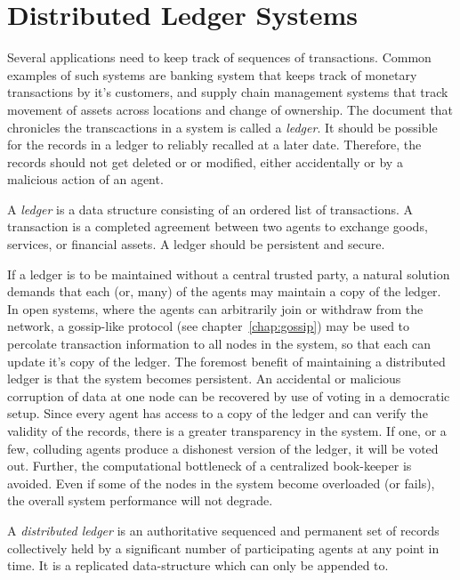 \section{Distributed Ledger Systems}

Several applications need to keep track of sequences of transactions. Common examples of such systems are banking system that 
keeps track of monetary transactions by it's customers, and supply chain management systems that track movement of assets across
locations and change of ownership. The document that chronicles the transcactions in a system is called a {\em ledger}. It should
be possible for the records in a ledger to reliably recalled at a later date. Therefore, the records should not get deleted or 
or modified, either accidentally or by a malicious action of an agent.

\begin{definition} [ledger]
	A {\em ledger} is a data structure consisting of an ordered list of transactions. A transaction is a completed agreement 
	between two agents to exchange goods, services, or financial assets. A ledger should be persistent and secure.
\end{definition}

 

If a ledger is to be maintained without a central trusted party, a natural solution demands that each 
(or, many) of the agents may maintain a copy of the ledger. In open systems, where the agents can arbitrarily join or withdraw from 
the network, a gossip-like protocol (see chapter~\ref{chap:gossip}) may be used to percolate transaction information to all nodes in 
the system, so that each can update it's copy of the ledger. The foremost benefit of maintaining a distributed ledger is that the 
system becomes persistent. An accidental or malicious corruption of data at one node can be recovered by use of voting in a 
democratic setup. Since every agent has access to a copy of the ledger and can verify the validity of the records, there is a greater 
transparency in the system. If one, or a few, colluding agents produce a dishonest version of the ledger, it will be voted out.
Further, the computational bottleneck of a centralized book-keeper is avoided. Even if some of the nodes in the system become
overloaded (or fails), the overall system performance will not degrade. 

\begin{definition} 
	A {\em distributed ledger} is an authoritative sequenced and permanent set of records collectively held by a significant 
	number of participating agents at any point in time. It is a replicated data-structure which can only be appended to.
\end{definition}

